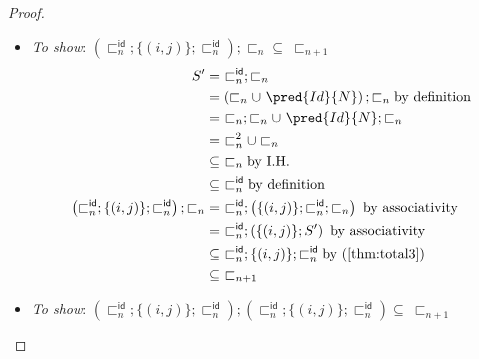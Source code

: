 \begin{lem}
{\begin{proof}
\begin{itemize}
\begin{align}
				&\subseteq\ \sqsubset_{n + 1}
			\end{align}
		\item \textit{To show}: $\left( \sqsubset_n^\mathsf{id} ; \{ (i, j) \} ; \sqsubset_n^\mathsf{id} \right) ; \sqsubset_n \subseteq\ \sqsubset_{n + 1}$
			\begin{align}
				S' &=\ \sqsubset_n^\mathsf{id} ; \sqsubset_n \\
					&= \left( \sqsubset_n \cup\ \pred{Id}{N} \right) ; \sqsubset_n \text{by definition} \\
					&=\ \sqsubset_n ; \sqsubset_n \cup\ \pred{Id}{N} ; \sqsubset_n \\
					&=\ \sqsubset_n^2 \cup \sqsubset_n \\
					&\subseteq\ \sqsubset_n \text{by I.H.} \\
					\label{thm:total3} &\subseteq\ \sqsubset_n^\mathsf{id} \text{by definition} \\
				\left( \sqsubset_n^\mathsf{id} ; \{ (i, j) \} ; \sqsubset_n^\mathsf{id} \right) ; \sqsubset_n &=\ \sqsubset_n^\mathsf{id} ; \left( \{ (i, j) \} ; \sqsubset_n^\mathsf{id} ; \sqsubset_n \right) \text{ by associativity} \\
				&=\ \sqsubset_n^\mathsf{id} ; \left( \{ (i, j) \} ; S' \right) \text{ by associativity} \\
				&\subseteq\ \sqsubset_n^\mathsf{id} ; \{ (i, j) \} ; \sqsubset_n^\mathsf{id} \text{by (\ref{thm:total3})} \\
				&\subseteq\ \sqsubset_{n + 1}
			\end{align}
		\item \textit{To show}: $\left( \sqsubset_n^\mathsf{id} ; \{ (i, j) \} ; \sqsubset_n^\mathsf{id} \right) ; \left( \sqsubset_n^\mathsf{id} ; \{ (i, j) \} ; \sqsubset_n^\mathsf{id} \right) \subseteq\ \sqsubset_{n + 1}$
		

\end{itemize}
\end{proof}}
\end{lem}
